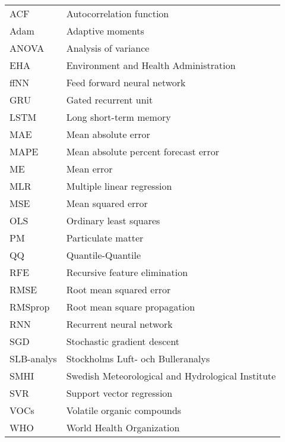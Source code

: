 \begin{tabular}{l@{$\dots\dots$}p{12cm}}
ACF \dotfill & Autocorrelation function \\
Adam \dotfill & Adaptive moments \\
ANOVA \dotfill &  Analysis of variance  \\
EHA \dotfill & Environment and Health Administration \\
ffNN \dotfill & Feed forward neural network   \\
GRU \dotfill & Gated recurrent unit \\
LSTM \dotfill &  Long short-term memory\\
MAE\dotfill & Mean absolute error \\
MAPE \dotfill & Mean absolute percent forecast error \\
ME \dotfill & Mean error \\
MLR \dotfill & Multiple linear regression \\
MSE\dotfill & Mean squared error \\
OLS \dotfill & Ordinary least squares \\
PM \dotfill & Particulate matter \\
QQ  \dotfill & Quantile-Quantile \\
RFE \dotfill & Recursive feature elimination \\
RMSE\dotfill & Root mean squared error\\
RMSprop \dotfill & Root mean square propagation\\
RNN\dotfill & Recurrent neural network \\
SGD \dotfill & Stochastic gradient descent \\
SLB-analys \dotfill & Stockholms Luft- och Bulleranalys \\
SMHI\dotfill & Swedish Meteorological and Hydrological Institute \\
SVR \dotfill & Support vector regression \\
VOCs \dotfill & Volatile organic compounds \\
WHO \dotfill & World Health Organization \\
\end{tabular}